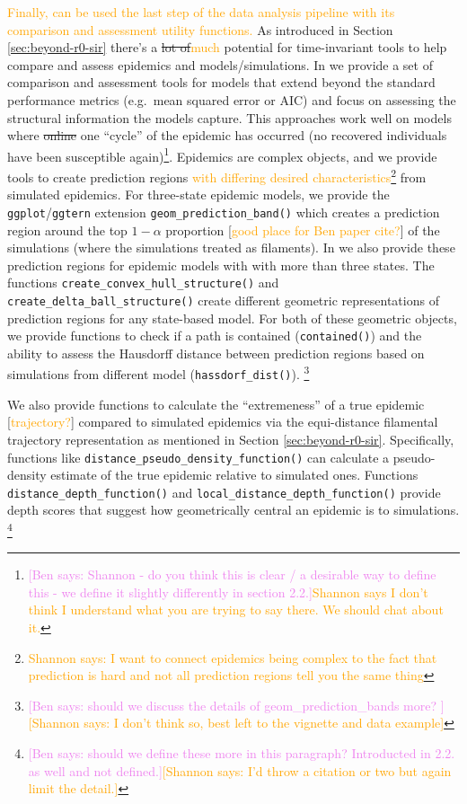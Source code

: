 \documentclass[
  shortnames]{jss}
\begin{document}
\textcolor{orange}{Finally,  can be used the last step of the data analysis pipeline with its comparison and assessment utility functions.}
As introduced in Section \ref{sec:beyond-r0-sir} there's a
\sout{lot of}\textcolor{orange}{much} potential for time-invariant tools
to help compare and assess epidemics and models/simulations. In
 we provide a set of comparison and assessment tools for
models that extend beyond the standard performance metrics (e.g.~mean
squared error or AIC) and focus on assessing the structural information
the models capture. This approaches work well on models where
\sout{online} one ``cycle'' of the epidemic has occurred (no recovered
individuals have been susceptible
again)\footnote{\textcolor{violet}{[Ben says: Shannon - do you think this is clear / a desirable way to define this - we define it slightly differently in section 2.2.]}\textcolor{orange}{Shannon says I don't think I understand what you are trying to say there.  We should chat about it.}}.
Epidemics are complex objects, and we provide tools to create prediction
regions
\textcolor{orange}{with differing desired characteristics}\footnote{\textcolor{orange}{Shannon says: I want to connect epidemics being complex to the fact that prediction is hard and not all prediction regions tell you the same thing}}
from simulated epidemics. For three-state epidemic models, we provide
the \texttt{ggplot}/\texttt{ggtern} extension
\texttt{geom\_prediction\_band()} which creates a prediction region
around the top \(1-\alpha\) proportion
{[}\textcolor{orange}{good place for Ben paper cite?}{]} of the
simulations (where the simulations treated as filaments). In
 we also provide these prediction regions for epidemic
models with with more than three states. The functions
\texttt{create\_convex\_hull\_structure()} and
\texttt{create\_delta\_ball\_structure()} create different geometric
representations of prediction regions for any state-based model. For
both of these geometric objects, we provide functions to check if a path
is contained (\texttt{contained()}) and the ability to assess the
Hausdorff distance between prediction regions based on simulations from
different model (\texttt{hassdorf\_dist()}).
\footnote{\textcolor{violet}{[Ben says: should we discuss the details of geom\_prediction\_bands more? ]}\textcolor{orange}{[Shannon says: I don't think so, best left to the vignette and data example]}}

We also provide functions to calculate the ``extremeness'' of a true
epidemic {[}\textcolor{orange}{trajectory?}{]} compared to simulated
epidemics via the equi-distance filamental trajectory representation as
mentioned in Section \ref{sec:beyond-r0-sir}. Specifically, functions
like \texttt{distance\_pseudo\_density\_function()} can calculate a
pseudo-density estimate of the true epidemic relative to simulated ones.
Functions \texttt{distance\_depth\_function()} and
\texttt{local\_distance\_depth\_function()} provide depth scores that
suggest how geometrically central an epidemic is to simulations.
\footnote{\textcolor{violet}{[Ben says: should we define these more in this paragraph? Introducted in 2.2. as well and not defined.]}\textcolor{orange}{[Shannon says: I'd throw a citation or two but again limit the detail.]}}
\end{document}
